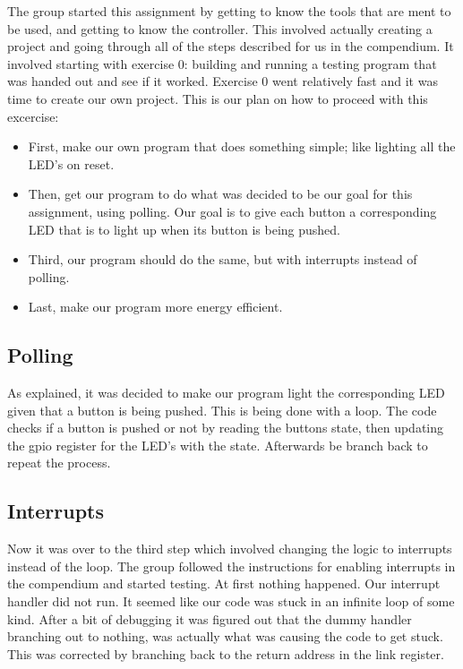 The group started this assignment by getting to know the tools that are ment to be used, and getting to know the controller. This involved actually creating a project and going through all of the steps described for us in the compendium. It involved starting with exercise 0: building and running a testing program that was handed out and see if it worked. Exercise 0 went relatively fast and it was time to create our own project. This is our plan on how to proceed with this excercise: 
\begin{itemize}
\item First, make our own program that does something simple; like lighting all the LED's on reset.
\item Then, get our program to do what was decided to be our goal for this assignment, using polling. Our goal is to give each button a corresponding LED that is to light up when its button is being pushed.
\item Third, our program should do the same, but with interrupts instead of polling.
\item Last, make our program more energy efficient.
\end{itemize}

\subsection{Polling}
As explained, it was decided to make our program light the corresponding LED given that a button is being pushed. This is being done with a loop. The code\cite{polling} checks if a button is pushed or not by reading the buttons state, then updating the gpio register for the LED’s with the state. Afterwards be branch back to repeat the process.

\subsection{Interrupts}
Now it was over to the third step which involved changing the logic to interrupts instead of the loop. The group followed the instructions for enabling interrupts in the compendium and started testing. At first nothing happened. Our interrupt handler did not run. It seemed like our code\cite{interrupts} was stuck in an infinite loop of some kind. After a bit of debugging it was figured out that the dummy handler branching out to nothing, was actually what was causing the code to get stuck. This was corrected by branching back to the return address in the link register.


